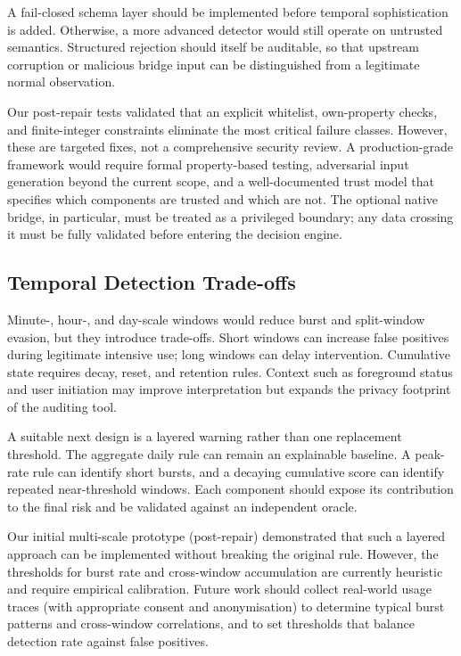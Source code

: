A fail-closed schema layer should be implemented before temporal sophistication is added. Otherwise, a more advanced detector would still operate on untrusted semantics. Structured rejection should itself be auditable, so that upstream corruption or malicious bridge input can be distinguished from a legitimate normal observation.

Our post-repair tests validated that an explicit whitelist, own-property checks, and finite-integer constraints eliminate the most critical failure classes. However, these are targeted fixes, not a comprehensive security review. A production-grade framework would require formal property-based testing, adversarial input generation beyond the current scope, and a well-documented trust model that specifies which components are trusted and which are not. The optional native bridge, in particular, must be treated as a privileged boundary; any data crossing it must be fully validated before entering the decision engine.

\subsection{Temporal Detection Trade-offs}

Minute-, hour-, and day-scale windows would reduce burst and split-window evasion, but they introduce trade-offs. Short windows can increase false positives during legitimate intensive use; long windows can delay intervention. Cumulative state requires decay, reset, and retention rules. Context such as foreground status and user initiation may improve interpretation but expands the privacy footprint of the auditing tool.

A suitable next design is a layered warning rather than one replacement threshold. The aggregate daily rule can remain an explainable baseline. A peak-rate rule can identify short bursts, and a decaying cumulative score can identify repeated near-threshold windows. Each component should expose its contribution to the final risk and be validated against an independent oracle.

Our initial multi-scale prototype (post-repair) demonstrated that such a layered approach can be implemented without breaking the original rule. However, the thresholds for burst rate and cross-window accumulation are currently heuristic and require empirical calibration. Future work should collect real-world usage traces (with appropriate consent and anonymisation) to determine typical burst patterns and cross-window correlations, and to set thresholds that balance detection rate against false positives.

